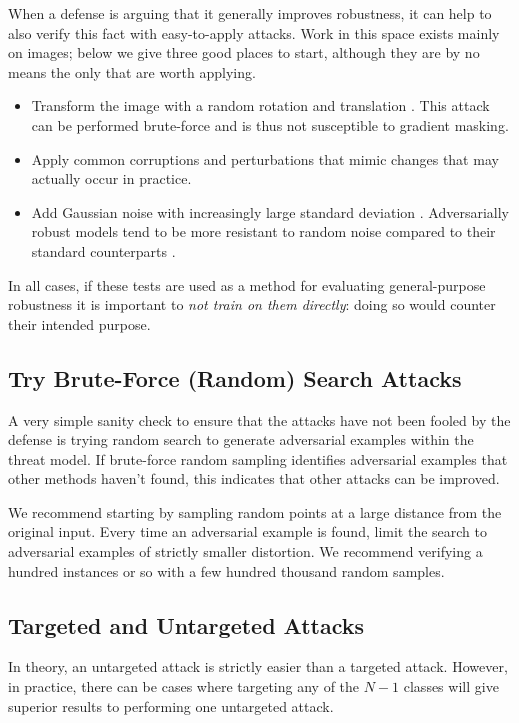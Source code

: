 \documentclass{article} %
\begin{document}
When a defense is arguing that it generally improves robustness, it can
help to also verify this fact with easy-to-apply attacks.
%
Work in this space exists mainly on images; below we give three
good places to start, although they are by no means the only
that are worth applying.
%
\begin{itemize}
\item Transform the image with a random rotation and translation
  \citep{engstrom2017rotation}. This attack can be performed
  brute-force and is thus not susceptible to gradient masking.
\item Apply common corruptions and perturbations
  \citep{hendrycks2018benchmarking} that mimic changes that may actually
  occur in practice.
\item Add Gaussian noise with increasingly large standard deviation
  \citep{ford2019adversarial}. Adversarially robust models tend to be more resistant to random noise compared to their standard counterparts
  \citep{fawzi2016robustness}.
\end{itemize}
In all cases, if these tests are used as a method for evaluating general-purpose
robustness it is important to \emph{not train on them directly}: doing so
would counter their intended purpose.

\subsection{Try Brute-Force (Random) Search Attacks}
\label{sec:randomnoise}

A very simple sanity check to ensure that the attacks have not
been fooled by the defense is trying random search to
generate adversarial examples within the threat model.
%
If brute-force random sampling
identifies adversarial examples that other methods haven't found, this
indicates that other attacks can be improved.

We recommend starting by sampling random points at a large distance from the original input.
%
Every time
an adversarial example is found, limit the search to adversarial
examples of strictly smaller distortion.
%
We recommend verifying a
hundred instances or so with a few hundred thousand random samples.

\subsection{Targeted and Untargeted Attacks}
\label{sec:targeted}
In theory, an untargeted attack is strictly easier than a targeted attack.
%
However, in practice, there can be cases where targeting any of the $N-1$ classes
will give superior results to performing one untargeted attack.
\end{document}

